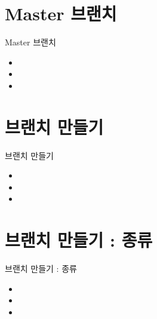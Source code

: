 \documentclass[aspectratio=1610,20pt,xcolor=pdftex,dvipsnames,table,handout]{beamer}
\begin{document}
		\section{Master 브랜치}
		\begin{frame} [t,plain]
			\begin{block} {Master 브랜치}
			\setlength{\leftmargini}{2em}			
			\begin{itemize}
				\item 
				\item 
				\item 
			\end{itemize}
			\end{block}						
		\end{frame}						

		\section{브랜치 만들기}
		\begin{frame} [t,plain]
			\begin{block} {브랜치 만들기}
			\setlength{\leftmargini}{2em}			
			\begin{itemize}
				\item 
				\item 
				\item 
			\end{itemize}
			\end{block}						
		\end{frame}						


		
		\section{브랜치 만들기 : 종류 }
		\begin{frame} [t,plain]
			\begin{block} {브랜치 만들기 : 종류 }
			\setlength{\leftmargini}{2em}			
			\begin{itemize}
				\item 
				\item 
				\item 
			\end{itemize}
			\end{block}						
		\end{frame}						
\end{document}
